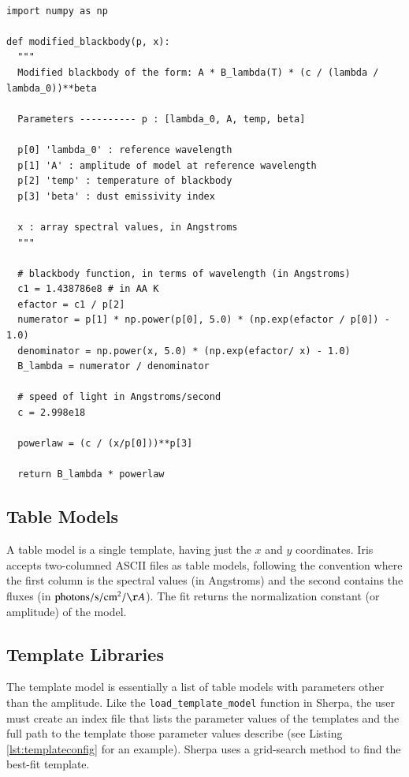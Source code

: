 \documentclass[final,5p,authoryear]{elsarticle}
\begin{document}
\begin{lstlisting}[style=python,
	caption={Example of a user-defined model that
can be dynamically loaded into Iris. The code implements a modified blackbody
and can be combined in Iris with other built-in and custom components.},
	label=lst:user_model_example]

import numpy as np

def modified_blackbody(p, x):
  """
  Modified blackbody of the form: A * B_lambda(T) * (c / (lambda / lambda_0))**beta

  Parameters ---------- p : [lambda_0, A, temp, beta]

  p[0] 'lambda_0' : reference wavelength
  p[1] 'A' : amplitude of model at reference wavelength
  p[2] 'temp' : temperature of blackbody
  p[3] 'beta' : dust emissivity index

  x : array spectral values, in Angstroms
  """

  # blackbody function, in terms of wavelength (in Angstroms)
  c1 = 1.438786e8 # in AA K
  efactor = c1 / p[2]
  numerator = p[1] * np.power(p[0], 5.0) * (np.exp(efactor / p[0]) - 1.0)
  denominator = np.power(x, 5.0) * (np.exp(efactor/ x) - 1.0)
  B_lambda = numerator / denominator

  # speed of light in Angstroms/second
  c = 2.998e18

  powerlaw = (c / (x/p[0]))**p[3]

  return B_lambda * powerlaw
\end{lstlisting}


\subsection{Table Models} A table model is a single template, having just the
$x$ and $y$ coordinates. Iris accepts two-columned ASCII files as table models,
following the convention where the first column is the spectral values (in
Angstroms) and the second contains the fluxes (in
$\mathrm{photons}/\mathrm{s}/\mathrm{cm}^{2}/{\AA}$). The fit returns the
normalization constant (or amplitude) of the model.

\subsection{Template Libraries} The template model is essentially a list of
table models with parameters other than the amplitude. Like the
\texttt{load\_template\_model} function in Sherpa, the user must create an index
file that lists the parameter values of the templates and the full path to the
template those parameter values describe (see Listing \ref{lst:templateconfig}
for an example). Sherpa uses a grid-search method to find the best-fit template.
\end{document}
